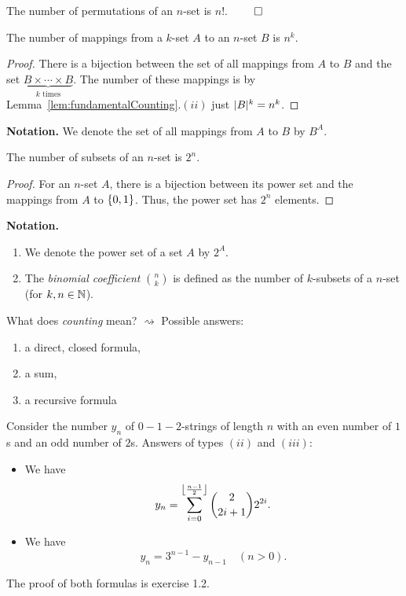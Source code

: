 \documentclass[language=english]{../../Template/TemplateLecture}
\begin{document}
\begin{corollary}
    The number of permutations of an $n$-set is $n!$. \hfill $\qed$
\end{corollary}

\begin{prop}
    The number of mappings from a $k$-set $A$ to an $n$-set $B$ is $n^k$.
\end{prop}

\begin{proof}
    There is a bijection between the set of all mappings from $A$ to $B$ and the set $\underset{\text{$k$ times}}{\underbrace{B \times \cdots \times B}}$. The number of these mappings is by Lemma~\ref{lem:fundamentalCounting}.$(ii)$ just $\abs{B}^k = n^k$.
\end{proof}

\textbf{Notation.} We denote the set of all mappings from $A$ to $B$ by $B^A$.

\begin{prop}
    The number of subsets of an $n$-set is $2^n$.
\end{prop}

\begin{proof}
    For an $n$-set $A$, there is a bijection between its power set and the mappings from $A$ to $\set{0,1}$. Thus, the power set has $2^n$ elements.
\end{proof}

\textbf{Notation.} 
\begin{enumerate}[$(i)$]
    \item We denote the power set of a set $A$ by $2^A$.
    \item The \emph{binomial coefficient} $\binom{n}{k}$ is defined as the number of $k$-subsets of a $n$-set (for $k, n \in \IN$).
\end{enumerate}

What does \emph{counting} mean? $\rightsquigarrow$ Possible answers:
\begin{enumerate}[$(i)$]
    \item a direct, closed formula,
    \item a sum,
    \item a recursive formula
\end{enumerate}

\begin{beispiel}
    Consider the number $y_n$ of $0-1-2$-strings of length $n$ with an even number of $1$s and an odd number of $2$s. Answers of types $(ii)$ and $(iii)$:
    \begin{itemize}
        \item We have 
        \begin{equation}
            y_n = \sum_{i=0}^{\floor*{\frac{n-1}{2}}}\binom{2}{2i+1}2^{2i}.
        \end{equation}
        \item We have 
        \begin{equation}
            y_n = 3^{n-1} - y_{n-1} \quad (n > 0).
        \end{equation}
    \end{itemize}
\end{beispiel}
The proof of both formulas is exercise 1.2.
\end{document}

